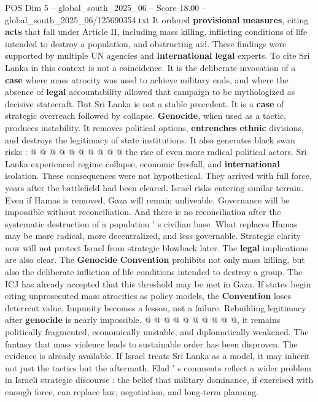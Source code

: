 \begin{textsample}{POS Dim 5 – global\_south\_2025\_06 – Score 18.00 – global\_south\_2025\_06/125690354.txt}
It ordered \textbf{provisional} \textbf{measures}, citing \textbf{acts} that fall under Article II, including mass killing, inflicting conditions of life intended to destroy a population, and obstructing aid.
These findings were supported by multiple UN agencies and \textbf{international} \textbf{legal} experts.
To cite Sri Lanka in this context is not a coincidence.
It is the deliberate invocation of a \textbf{case} where mass atrocity was used to achieve military ends, and where the absence of \textbf{legal} accountability allowed that campaign to be mythologized as decisive statecraft.
But Sri Lanka is not a stable precedent.
It is a \textbf{case} of strategic overreach followed by collapse. \textbf{Genocide}, when used as a tactic, produces instability.
It removes political options, \textbf{entrenches} \textbf{ethnic} divisions, and destroys the legitimacy of state institutions.
It also generates black swan risks : @ @ @ @ @ @ @ @ @ @ the rise of even more radical political actors.
Sri Lanka experienced regime collapse, economic freefall, and \textbf{international} isolation.
These consequences were not hypothetical.
They arrived with full force, years after the battlefield had been cleared.
Israel risks entering similar terrain.
Even if Hamas is removed, Gaza will remain unliveable.
Governance will be impossible without reconciliation.
And there is no reconciliation after the systematic destruction of a population ' s civilian base.
What replaces Hamas may be more radical, more decentralized, and less governable.
Strategic clarity now will not protect Israel from strategic blowback later.
The \textbf{legal} implications are also clear.
The \textbf{Genocide} \textbf{Convention} prohibits not only mass killing, but also the deliberate infliction of life conditions intended to destroy a group.
The ICJ has already accepted that this threshold may be met in Gaza.
If states begin citing unprosecuted mass atrocities as policy models, the \textbf{Convention} loses deterrent value.
Impunity becomes a lesson, not a failure.
Rebuilding legitimacy after \textbf{genocide} is nearly impossible. @ @ @ @ @ @ @ @ @ @, it remains politically fragmented, economically unstable, and diplomatically weakened.
The fantasy that mass violence leads to sustainable order has been disproven.
The evidence is already available.
If Israel treats Sri Lanka as a model, it may inherit not just the tactics but the aftermath.
Elad ' s comments reflect a wider problem in Israeli strategic discourse : the belief that military dominance, if exercised with enough force, can replace law, negotiation, and long-term planning.

\end{textsample}
